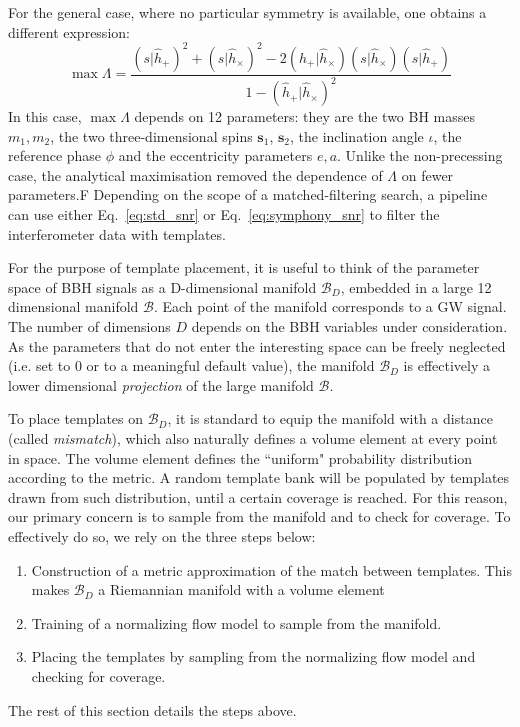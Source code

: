 \documentclass[twocolumn,showpacs,preprintnumbers,nofootinbib,prd,
superscriptaddress,10pt]{revtex4-2}
\newcommand{\rescalar}[2]{( #1 |#2 )}
\begin{document}
For the general case, where no particular symmetry is available, one obtains a different expression:
\begin{equation}\label{eq:symphony_snr}
	\max \Lambda = \frac{ \rescalar{s}{\hat{h}_+}^2 + \rescalar{s}{\hat{h}_\times}^2 -2\rescalar{\hat{h}_+}{\hat{h}_\times}\rescalar{s}{\hat{h}_\times}\rescalar{s}{\hat{h}_+}}{1- \rescalar{\hat{h}_+}{\hat{h}_\times}^2}
\end{equation}
In this case, $\max\Lambda$ depends on 12 parameters: they are the two BH masses $m_1, m_2$, the two three-dimensional spins $\mathbf{s}_1$, $\mathbf{s}_2$, the inclination angle $\iota$, the reference phase $\phi$ and the eccentricity parameters $e, a$.
Unlike the non-precessing case, the analytical maximisation removed the dependence of $\Lambda$ on fewer parameters.F
Depending on the scope of a matched-filtering search, a pipeline can use either Eq.~\eqref{eq:std_snr} or Eq.~\eqref{eq:symphony_snr} to filter the interferometer data with templates.

For the purpose of template placement, it is useful to think of the parameter space of BBH signals as a D-dimensional manifold $\mathcal{B}_D$, embedded in a large 12 dimensional manifold $\mathcal{B}$. Each point of the manifold corresponds to a GW signal. The number of dimensions $D$ depends on the BBH variables under consideration.
As the parameters that do not enter the interesting space can be freely neglected (i.e. set to $0$ or to a meaningful default value), the manifold $\mathcal{B}_D$ is effectively a lower dimensional {\it projection} of the large manifold $\mathcal{B}$.

To place templates on $\mathcal{B}_D$, it is standard to equip the manifold with a distance (called {\it mismatch}), which also naturally defines a volume element at every point in space. The volume element defines the ``uniform" probability distribution according to the metric.
A random template bank will be populated by templates drawn from such distribution, until a certain coverage is reached. For this reason, our primary concern is to sample from the manifold and to check for coverage. To effectively do so, we rely on the three steps below:
\begin{enumerate}
	\item Construction of a metric approximation of the match between templates. This makes $\mathcal{B}_D$ a Riemannian manifold with a volume element
	\item Training of a normalizing flow model to sample from the manifold. 
	\item Placing the templates by sampling from the normalizing flow model and checking for coverage.
\end{enumerate}
The rest of this section details the steps above.
\end{document}

